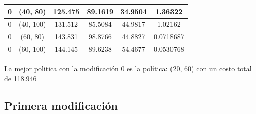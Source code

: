\documentclass[12pt, spanish]{article}
\begin{document}
\begin{table}[H]
{\begin{tabular}{|c|c|c|c|c|c|}
0                     & (40, 80)          & 125.475              & 89.1619                  & 34.9504                         & 1.36322                   \\ \hline
0                     & (40, 100)         & 131.512              & 85.5084                  & 44.9817                         & 1.02162                   \\ \hline
0                     & (60, 80)          & 143.831              & 98.8766                  & 44.8827                         & 0.0718687                 \\ \hline
0                     & (60, 100)         & 144.145              & 89.6238                  & 54.4677                         & 0.0530768                 \\ \hline
\end{tabular}
}
\end{table}

La mejor politica con la modificación 0 es la política: (20, 60) con un costo total de 118.946



\subsection{Primera modificación}
\end{document}
